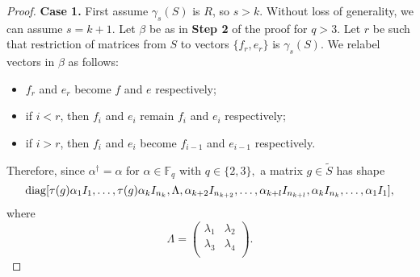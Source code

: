 \begin{proof}
{\bf Case 1.}
First assume $\gamma_s(S)$ is  $R$, so $s>k.$ Without loss of generality, we can assume $s=k+1.$  Let $\beta$ be as in {\bf Step 2} of the proof for $q>3$. Let $r$ be such that restriction of matrices from $S$ to vectors $\{f_r, e_r\}$ is $\gamma_s(S).$ We relabel vectors in $\beta$ as follows:
\begin{itemize}
\item $f_r$ and $e_r$ become $f$ and $e$ respectively;
\item if $i<r$, then $f_i$ and $e_i$ remain $f_i$ and $e_i$ respectively;
\item if $i>r$, then  $f_i$ and $e_i$ become $f_{i-1}$ and $e_{i-1}$ respectively.
\end{itemize}
Therefore, since $\alpha^{\dagger}=\alpha$ for $\alpha \in \mathbb{F}_q$ with $q \in \{2,3\},$ a matrix $g \in \tilde{S}$ has shape 
$$\mathrm{diag}[\tau(g)\alpha_1 I_1, \ldots, \tau(g) \alpha_k I_{n_{k}}, \Lambda, \alpha_{k+2} I_{n_{k+2}}, \ldots, \alpha_{k+l} I_{n_{k+l}}, \alpha_k I_{n_k}, \ldots, \alpha_1 I_{1} ],$$
where 
\begin{equation*}
\Lambda =
\begin{pmatrix}
 \lambda_1 & \lambda_2  \\
 \lambda_3 & \lambda_4  \\
\end{pmatrix}.
\end{equation*}


\end{proof}

